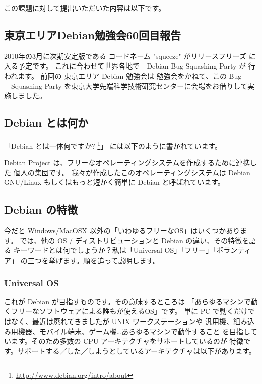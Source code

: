 \documentclass[mingoth,a4paper]{jsarticle}
\begin{document}
この課題に対して提出いただいた内容は以下です。



\subsection{東京エリアDebian勉強会60回目報告}

2010年の3月に次期安定版である コードネーム "squeeze" がリリースフリーズ
に入る予定です。 これに合わせて世界各地で　Debian Bug Squashing Party が
行われます。 前回の 東京エリア Debian 勉強会は 勉強会をかねて、この Bug
　Squashing Party を東京大学先端科学技術研究センターに会場をお借りして実
施しました。


\subsection{Debian とは何か}
「Debian とは一体何ですか? \footnote{\url{http://www.debian.org/intro/about}}」
には以下のように書かれています。

\begin{description}
\item \small Debian Project は、フリーなオペレーティングシステムを作成するために連携した
個人の集団です。 我々が作成したこのオペレーティングシステムは Debian GNU/Linux 
もしくはもっと短かく簡単に Debian と呼ばれています。
\end{description}

\subsection{Debian の特徴}
今だと Windows/MacOSX 以外の「いわゆるフリーなOS」はいくつかあります。
では、他の OS / ディストリビューションと Debian の違い、その特徴を語る
キーワードとは何でしょうか？私は「Universal OS」「フリー」「ボランティア」
の三つを挙げます。順を追って説明します。

\subsubsection{Universal OS}
これが Debian が目指すものです。その意味するところは
「あらゆるマシンで動くフリーなソフトウェアによる誰もが使えるOS」です。
単に PC で動くだけではなく、最近は廃れてきましたが UNIX ワークステーションや
汎用機、組み込み用機器、モバイル端末、ゲーム機…あらゆるマシンで動作すること
を目指しています。そのため多数の CPU アーキテクチャをサポートしているのが
特徴です。サポートする／した／しようとしているアーキテクチャは以下があります。
\end{document}
